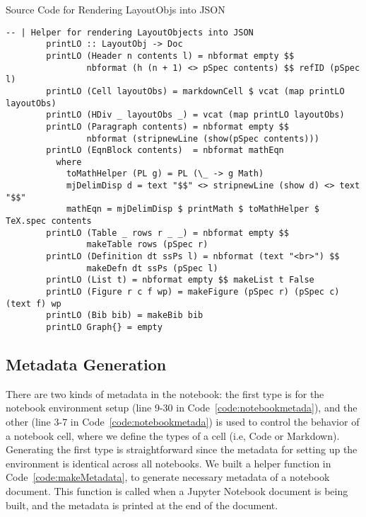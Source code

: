 \begin{listing}[h]
	\caption{Source Code for Rendering LayoutObjs into JSON}
	\label{code:LOtoJSON}
	\begin{lstlisting}[language=haskell1, tabsize=1, basicstyle=\small\ttfamily]
		-- | Helper for rendering LayoutObjects into JSON
		printLO :: LayoutObj -> Doc
		printLO (Header n contents l) = nbformat empty $$
				nbformat (h (n + 1) <> pSpec contents) $$ refID (pSpec l)
		printLO (Cell layoutObs) = markdownCell $ vcat (map printLO layoutObs)
		printLO (HDiv _ layoutObs _) = vcat (map printLO layoutObs) 
		printLO (Paragraph contents) = nbformat empty $$
				nbformat (stripnewLine (show(pSpec contents)))
		printLO (EqnBlock contents)  = nbformat mathEqn
		  where
		    toMathHelper (PL g) = PL (\_ -> g Math)
		    mjDelimDisp d = text "$$" <> stripnewLine (show d) <> text "$$" 
		    mathEqn = mjDelimDisp $ printMath $ toMathHelper $ TeX.spec contents
		printLO (Table _ rows r _ _) = nbformat empty $$
				makeTable rows (pSpec r)
		printLO (Definition dt ssPs l) = nbformat (text "<br>") $$ 
				makeDefn dt ssPs (pSpec l)
		printLO (List t) = nbformat empty $$ makeList t False
		printLO (Figure r c f wp) = makeFigure (pSpec r) (pSpec c) (text f) wp
		printLO (Bib bib) = makeBib bib
		printLO Graph{} = empty 
	\end{lstlisting}
\end{listing}

\subsection{Metadata Generation}
There are two kinds of metadata in the notebook: the first type is for the 
notebook environment setup (line 9-30 in Code~\ref{code:notebookmetada}), and 
the other (line 3-7 in Code~\ref{code:notebookmetada}) is used to control the 
behavior of a notebook cell, where we define the types of a cell (i.e, Code or 
Markdown). Generating the first type is straightforward since the metadata for 
setting up the environment is identical across all notebooks. We built a helper 
function  in Code~\ref{code:makeMetadata}, to generate 
necessary metadata of a notebook document. This function is called when a 
Jupyter Notebook document is being built, and the metadata is printed at the 
end of the document.

